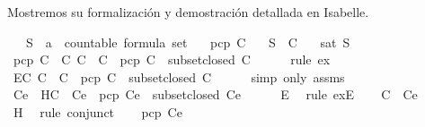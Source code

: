 \begin{isabellebody}
\begin{isamarkuptext}
  Mostremos su formalización y demostración detallada en Isabelle.%
\end{isamarkuptext}\isamarkuptrue%
\isamarkupfalse%
\isanewline
\ \ \ S\ {\isacharcolon}{\isacharcolon}\ {\isachardoublequoteopen}{\isacharprime}a\ {\isacharcolon}{\isacharcolon}\ countable\ formula\ set{\isachardoublequoteclose}\isanewline
\ \ \ {\isachardoublequoteopen}pcp\ C{\isachardoublequoteclose}\isanewline
\ \ \ {\isachardoublequoteopen}S\ {\isasymin}\ C{\isachardoublequoteclose}\isanewline
\ \ \ {\isachardoublequoteopen}sat\ S{\isachardoublequoteclose}\isanewline
%
\isadelimproof
%
\endisadelimproof
%
\isatagproof
{}\isamarkupfalse%
\ {\isacharminus}\isanewline
\ \ \isamarkupfalse%
\ {\isachardoublequoteopen}pcp\ C\ {\isasymLongrightarrow}\ {\isasymexists}C{\isacharprime}{\isachardot}\ C\ {\isasymsubseteq}\ C{\isacharprime}\ {\isasymand}\ pcp\ C{\isacharprime}\ {\isasymand}\ subset{\isacharunderscore}closed\ C{\isacharprime}{\isachardoublequoteclose}\isanewline
\ \ \ \ \isamarkupfalse%
\ {\isacharparenleft}rule\ ex{}{\isacharparenright}\isanewline
\ \ \isamarkupfalse%
\ \isamarkupfalse%
\ E{}{\isacharcolon}{\isachardoublequoteopen}{\isasymexists}C{\isacharprime}{\isachardot}\ C\ {\isasymsubseteq}\ C{\isacharprime}\ {\isasymand}\ pcp\ C{\isacharprime}\ {\isasymand}\ subset{\isacharunderscore}closed\ C{\isacharprime}{\isachardoublequoteclose}\isanewline
\ \ \ \ \isamarkupfalse%
\ {\isacharparenleft}simp\ only{\isacharcolon}\ assms{\isacharparenleft}{}{\isacharparenright}{\isacharparenright}\isanewline
\ \ \isamarkupfalse%
\ Ce{\isacharprime}\ \ H{}{\isacharcolon}{\isachardoublequoteopen}C\ {\isasymsubseteq}\ Ce{\isacharprime}\ {\isasymand}\ pcp\ Ce{\isacharprime}\ {\isasymand}\ subset{\isacharunderscore}closed\ Ce{\isacharprime}{\isachardoublequoteclose}\isanewline
\ \ \ \ \isamarkupfalse%
\ E{}\ \isamarkupfalse%
\ {\isacharparenleft}rule\ exE{\isacharparenright}\isanewline
\ \ \isamarkupfalse%
\ {\isachardoublequoteopen}C\ {\isasymsubseteq}\ Ce{\isacharprime}{\isachardoublequoteclose}\isanewline
\ \ \ \ \isamarkupfalse%
\ H{}\ \isamarkupfalse%
\ {\isacharparenleft}rule\ conjunct{}{\isacharparenright}\isanewline
\ \ \isamarkupfalse%
\ {\isachardoublequoteopen}pcp\ Ce{\isacharprime}{\isachardoublequoteclose}\isanewline

\end{isabellebody}
